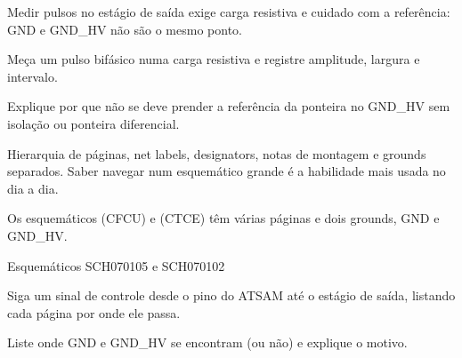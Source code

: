 \begin{noproduto}
Medir pulsos no estágio de saída exige carga resistiva e cuidado com a referência: GND e GND\_HV não são o mesmo ponto.
\end{noproduto}

\begin{paraestudar}
  \item {}
  \item {}
  \item {}
\end{paraestudar}

\begin{pratique}
  \item Meça um pulso bifásico numa carga resistiva e registre amplitude, largura e intervalo.
  \item Explique por que não se deve prender a referência da ponteira no GND\_HV sem isolação ou ponteira diferencial.
\end{pratique}

Hierarquia de páginas, net labels, designators, notas de montagem e grounds separados. Saber navegar num esquemático grande é a habilidade mais usada no dia a dia.

\begin{noproduto}
Os esquemáticos  (CFCU) e  (CTCE) têm várias páginas e dois grounds, GND e GND\_HV.
\end{noproduto}

\begin{paraestudar}
  \item {}
  \item Esquemáticos SCH070105 e SCH070102
\end{paraestudar}

\begin{pratique}
  \item Siga um sinal de controle desde o pino do ATSAM até o estágio de saída, listando cada página por onde ele passa.
  \item Liste onde GND e GND\_HV se encontram (ou não) e explique o motivo.
\end{pratique}

